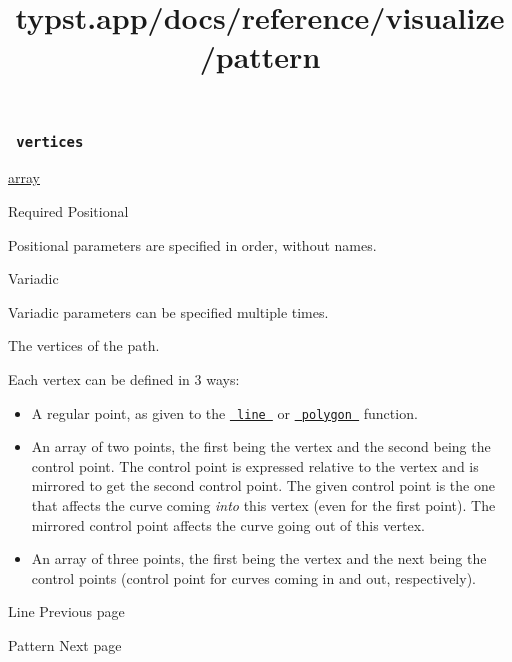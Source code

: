 \subsubsection{\texorpdfstring{\texttt{\ vertices\ }}{ vertices }}\label{parameters-vertices}

\href{/docs/reference/foundations/array/}{array}

{Required} {{ Positional }}

\label{parameters-vertices-positional-tooltip}
Positional parameters are specified in order, without names.

{{ Variadic }}

\label{parameters-vertices-variadic-tooltip}
Variadic parameters can be specified multiple times.

The vertices of the path.

Each vertex can be defined in 3 ways:

\begin{itemize}
\tightlist
\item
  A regular point, as given to the
  \href{/docs/reference/visualize/line/}{\texttt{\ line\ }} or
  \href{/docs/reference/visualize/polygon/}{\texttt{\ polygon\ }}
  function.
\item
  An array of two points, the first being the vertex and the second
  being the control point. The control point is expressed relative to
  the vertex and is mirrored to get the second control point. The given
  control point is the one that affects the curve coming \emph{into}
  this vertex (even for the first point). The mirrored control point
  affects the curve going out of this vertex.
\item
  An array of three points, the first being the vertex and the next
  being the control points (control point for curves coming in and out,
  respectively).
\end{itemize}

\href{/docs/reference/visualize/line/}{\pandocbounded{}}

{ Line } { Previous page }

\href{/docs/reference/visualize/pattern/}{\pandocbounded{}}

{ Pattern } { Next page }


\title{typst.app/docs/reference/visualize/pattern}

